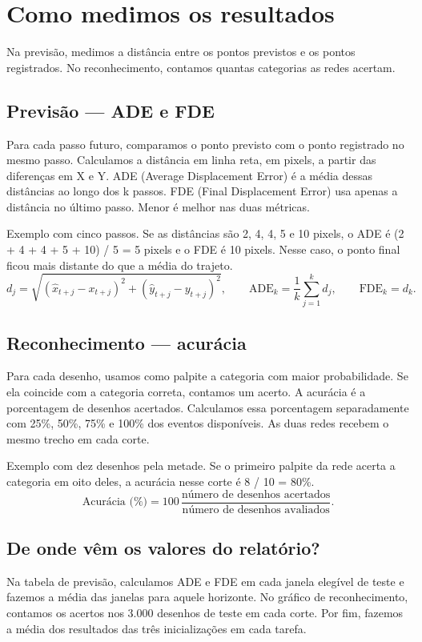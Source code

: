 \documentclass[11pt,a4paper]{article}
\begin{document}
\section*{Como medimos os resultados}
Na previsão, medimos a distância entre os pontos previstos e os pontos registrados. No reconhecimento, contamos quantas categorias as redes acertam.
\subsection*{Previsão — ADE e FDE}
Para cada passo futuro, comparamos o ponto previsto com o ponto registrado no mesmo passo. Calculamos a distância em linha reta, em pixels, a partir das diferenças em X e Y. ADE (Average Displacement Error) é a média dessas distâncias ao longo dos k passos. FDE (Final Displacement Error) usa apenas a distância no último passo. Menor é melhor nas duas métricas.

Exemplo com cinco passos. Se as distâncias são 2, 4, 4, 5 e 10 pixels, o ADE é (2 + 4 + 4 + 5 + 10) / 5 = 5 pixels e o FDE é 10 pixels. Nesse caso, o ponto final ficou mais distante do que a média do trajeto.
\[
d_j=\sqrt{(\widehat{x}_{t+j}-x_{t+j})^2+(\widehat{y}_{t+j}-y_{t+j})^2},\qquad\mathrm{ADE}_k=\frac{1}{k}\sum_{j=1}^{k}d_j,\qquad\mathrm{FDE}_k=d_k.
\]
\subsection*{Reconhecimento — acurácia}
Para cada desenho, usamos como palpite a categoria com maior probabilidade. Se ela coincide com a categoria correta, contamos um acerto. A acurácia é a porcentagem de desenhos acertados. Calculamos essa porcentagem separadamente com 25\%, 50\%, 75\% e 100\% dos eventos disponíveis. As duas redes recebem o mesmo trecho em cada corte.

Exemplo com dez desenhos pela metade. Se o primeiro palpite da rede acerta a categoria em oito deles, a acurácia nesse corte é 8 / 10 = 80\%.
\[
\text{Acurácia (\%)}=100\,\frac{\text{número de desenhos acertados}}{\text{número de desenhos avaliados}}.
\]
\subsection*{De onde vêm os valores do relatório?}
Na tabela de previsão, calculamos ADE e FDE em cada janela elegível de teste e fazemos a média das janelas para aquele horizonte. No gráfico de reconhecimento, contamos os acertos nos 3.000 desenhos de teste em cada corte. Por fim, fazemos a média dos resultados das três inicializações em cada tarefa.
\clearpage
\end{document}
